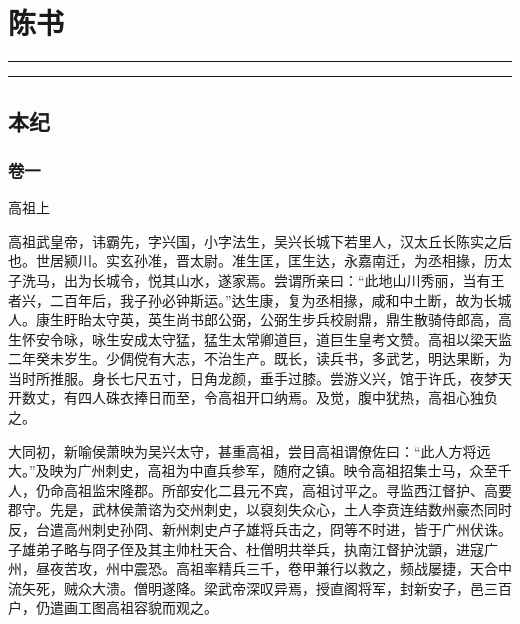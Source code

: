 \documentclass[]{article}
\date{}
\begin{document}
\hypertarget{header-n1065}{%
\section{陈书}\label{header-n1065}}

\begin{center}\rule{0.5\linewidth}{\linethickness}\end{center}

\tableofcontents

\begin{center}\rule{0.5\linewidth}{\linethickness}\end{center}

\hypertarget{header-n4159}{%
\subsection{本纪}\label{header-n4159}}

\hypertarget{header-n4160}{%
\subsubsection{卷一}\label{header-n4160}}

高祖上

高祖武皇帝，讳霸先，字兴国，小字法生，吴兴长城下若里人，汉太丘长陈实之后也。世居颍川。实玄孙准，晋太尉。准生匡，匡生达，永嘉南迁，为丞相掾，历太子洗马，出为长城令，悦其山水，遂家焉。尝谓所亲曰：``此地山川秀丽，当有王者兴，二百年后，我子孙必钟斯运。''达生康，复为丞相掾，咸和中土断，故为长城人。康生盱眙太守英，英生尚书郎公弼，公弼生步兵校尉鼎，鼎生散骑侍郎高，高生怀安令咏，咏生安成太守猛，猛生太常卿道巨，道巨生皇考文赞。高祖以梁天监二年癸未岁生。少倜傥有大志，不治生产。既长，读兵书，多武艺，明达果断，为当时所推服。身长七尺五寸，日角龙颜，垂手过膝。尝游义兴，馆于许氏，夜梦天开数丈，有四人硃衣捧日而至，令高祖开口纳焉。及觉，腹中犹热，高祖心独负之。

大同初，新喻侯萧映为吴兴太守，甚重高祖，尝目高祖谓僚佐曰：``此人方将远大。''及映为广州刺史，高祖为中直兵参军，随府之镇。映令高祖招集士马，众至千人，仍命高祖监宋隆郡。所部安化二县元不宾，高祖讨平之。寻监西江督护、高要郡守。先是，武林侯萧谘为交州刺史，以裒刻失众心，土人李贲连结数州豪杰同时反，台遣高州刺史孙冏、新州刺史卢子雄将兵击之，冏等不时进，皆于广州伏诛。子雄弟子略与冏子侄及其主帅杜天合、杜僧明共举兵，执南江督护沈顗，进寇广州，昼夜苦攻，州中震恐。高祖率精兵三千，卷甲兼行以救之，频战屡捷，天合中流矢死，贼众大溃。僧明遂降。梁武帝深叹异焉，授直阁将军，封新安子，邑三百户，仍遣画工图高祖容貌而观之。
\end{document}
